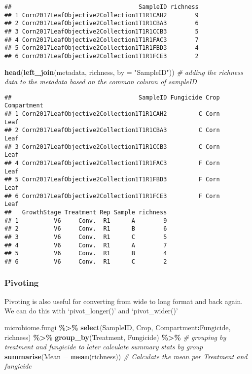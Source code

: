 \documentclass[
]{article}
\newenvironment{Shaded}{\begin{snugshade}}{\end{snugshade}}
\newcommand{\AttributeTok}[1]{\textcolor[rgb]{0.13,0.29,0.53}{#1}}
\newcommand{\CommentTok}[1]{\textcolor[rgb]{0.56,0.35,0.01}{\textit{#1}}}
\newcommand{\FunctionTok}[1]{\textcolor[rgb]{0.13,0.29,0.53}{\textbf{#1}}}
\newcommand{\NormalTok}[1]{#1}
\newcommand{\SpecialCharTok}[1]{\textcolor[rgb]{0.81,0.36,0.00}{\textbf{#1}}}
\newcommand{\StringTok}[1]{\textcolor[rgb]{0.31,0.60,0.02}{#1}}
\begin{document}
\begin{verbatim}
##                                    SampleID richness
## 1 Corn2017LeafObjective2Collection1T1R1CAH2        9
## 2 Corn2017LeafObjective2Collection1T1R1CBA3        6
## 3 Corn2017LeafObjective2Collection1T1R1CCB3        5
## 4 Corn2017LeafObjective2Collection1T1R1FAC3        7
## 5 Corn2017LeafObjective2Collection1T1R1FBD3        4
## 6 Corn2017LeafObjective2Collection1T1R1FCE3        2
\end{verbatim}

\begin{Shaded}
\begin{Highlighting}[]
\FunctionTok{head}\NormalTok{(}\FunctionTok{left\_join}\NormalTok{(metadata, richness, }\AttributeTok{by =} \StringTok{"SampleID"}\NormalTok{)) }\CommentTok{\# adding the richness data to the metadata based on the common column of sampleID}
\end{Highlighting}
\end{Shaded}

\begin{verbatim}
##                                    SampleID Fungicide Crop Compartment
## 1 Corn2017LeafObjective2Collection1T1R1CAH2         C Corn        Leaf
## 2 Corn2017LeafObjective2Collection1T1R1CBA3         C Corn        Leaf
## 3 Corn2017LeafObjective2Collection1T1R1CCB3         C Corn        Leaf
## 4 Corn2017LeafObjective2Collection1T1R1FAC3         F Corn        Leaf
## 5 Corn2017LeafObjective2Collection1T1R1FBD3         F Corn        Leaf
## 6 Corn2017LeafObjective2Collection1T1R1FCE3         F Corn        Leaf
##   GrowthStage Treatment Rep Sample richness
## 1          V6     Conv.  R1      A        9
## 2          V6     Conv.  R1      B        6
## 3          V6     Conv.  R1      C        5
## 4          V6     Conv.  R1      A        7
## 5          V6     Conv.  R1      B        4
## 6          V6     Conv.  R1      C        2
\end{verbatim}

\subsubsection{Pivoting}\label{pivoting}

Pivoting is also useful for converting from wide to long format and back
again. We can do this with `pivot\_longer()' and `pivot\_wider()'

\begin{Shaded}
\begin{Highlighting}[]
\NormalTok{microbiome.fungi }\SpecialCharTok{\%\textgreater{}\%}
  \FunctionTok{select}\NormalTok{(SampleID, Crop, Compartment}\SpecialCharTok{:}\NormalTok{Fungicide, richness) }\SpecialCharTok{\%\textgreater{}\%}
   \FunctionTok{group\_by}\NormalTok{(Treatment, Fungicide) }\SpecialCharTok{\%\textgreater{}\%}  \CommentTok{\# grouping by treatment and fungicide to later calculate summary stats by group}
  \FunctionTok{summarise}\NormalTok{(}\AttributeTok{Mean =} \FunctionTok{mean}\NormalTok{(richness))  }\CommentTok{\# Calculate the mean per Treatment and fungicide}
\end{Highlighting}
\end{Shaded}
\end{document}
